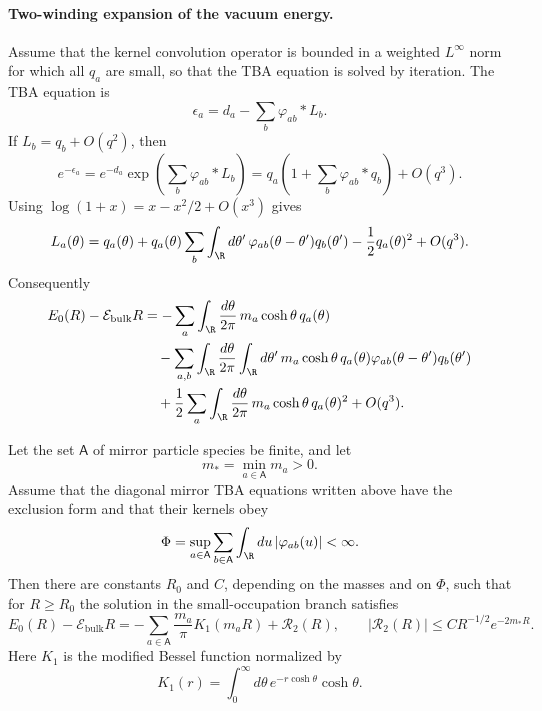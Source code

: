 \paragraph{Two-winding expansion of the vacuum energy.}
Assume that the kernel convolution operator is bounded in a weighted
\(L^\infty\) norm for which all \(q_a\) are small, so that the TBA equation is
solved by iteration.  The TBA equation is
\[
  \epsilon_a=d_a-\sum_b\varphi_{ab}*L_b .
\]
If \(L_b=q_b+O(q^2)\), then
\[
  e^{-\epsilon_a}
  =
  e^{-d_a}\exp\!\left(\sum_b\varphi_{ab}*L_b\right)
  =
  q_a\left(1+\sum_b\varphi_{ab}*q_b\right)+O(q^3).
\]
Using \(\log(1+x)=x-x^2/2+O(x^3)\) gives
\[
  L_a(\theta)
  =
  q_a(\theta)
  +
  q_a(\theta)\sum_b\int_{\R}d\theta'\,
  \varphi_{ab}(\theta-\theta')q_b(\theta')
  -\frac12 q_a(\theta)^2
  +O(q^3).
\]
Consequently
\[
\begin{split}
  E_0(R)-\mathcal E_{\mathrm{bulk}}R
  &=
  -\sum_a\int_{\R}\frac{d\theta}{2\pi}\,
  m_a\cosh\theta\,q_a(\theta)
\\
  &\quad
  -\sum_{a,b}\int_{\R}\frac{d\theta}{2\pi}\int_{\R}d\theta'\,
  m_a\cosh\theta\,
  q_a(\theta)\varphi_{ab}(\theta-\theta')q_b(\theta')
\\
  &\quad
  +\frac12\sum_a\int_{\R}\frac{d\theta}{2\pi}\,
  m_a\cosh\theta\,q_a(\theta)^2
  +O(q^3).
\end{split}
\]

\begin{proposition}
\label{prop:vacuum-luscher-term-remainder}
Let the set \(\mathsf A\) of mirror particle species be finite, and let
\[
  m_*=\min_{a\in\mathsf A}m_a>0 .
\]
Assume that the diagonal mirror TBA equations written above have the exclusion
form and that their kernels obey
\[
  \Phi
  =
  \sup_{a\in\mathsf A}
  \sum_{b\in\mathsf A}\int_{\R}du\,|\varphi_{ab}(u)|<\infty .
\]
Then there are constants \(R_0\) and \(C\), depending on the masses and on
\(\Phi\), such that for \(R\ge R_0\) the solution in the small-occupation
branch satisfies
\[
  E_0(R)-\mathcal E_{\mathrm{bulk}}R
  =
  -\sum_{a\in\mathsf A}\frac{m_a}{\pi}K_1(m_aR)
  +\mathcal R_2(R),
  \qquad
  |\mathcal R_2(R)|\le C R^{-1/2}e^{-2m_*R}.
\]
Here \(K_1\) is the modified Bessel function normalized by
\[
  K_1(r)=\int_0^\infty d\theta\,e^{-r\cosh\theta}\cosh\theta .
\]
\end{proposition}

